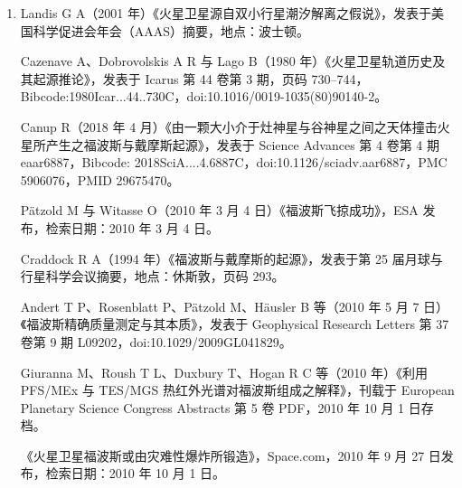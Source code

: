 \begin{enumerate}
\item Landis G A（2001 年）《火星卫星源自双小行星潮汐解离之假说》，发表于美国科学促进会年会（AAAS）摘要，地点：波士顿。

Cazenave A、Dobrovolskis A R 与 Lago B（1980 年）《火星卫星轨道历史及其起源推论》，发表于 Icarus 第 44 卷第 3 期，页码 730–744，Bibcode:1980Icar...44..730C，doi:10.1016/0019-1035(80)90140-2。

Canup R（2018 年 4 月）《由一颗大小介于灶神星与谷神星之间之天体撞击火星所产生之福波斯与戴摩斯起源》，发表于 Science Advances 第 4 卷第 4 期 eaar6887，Bibcode: 2018SciA....4.6887C，doi:10.1126/sciadv.aar6887，PMC 5906076，PMID 29675470。

Pätzold M 与 Witasse O（2010 年 3 月 4 日）《福波斯飞掠成功》，ESA 发布，检索日期：2010 年 3 月 4 日。

Craddock R A（1994 年）《福波斯与戴摩斯的起源》，发表于第 25 届月球与行星科学会议摘要，地点：休斯敦，页码 293。

Andert T P、Rosenblatt P、Pätzold M、Häusler B 等（2010 年 5 月 7 日）《福波斯精确质量测定与其本质》，发表于 Geophysical Research Letters 第 37 卷第 9 期 L09202，doi:10.1029/2009GL041829。

Giuranna M、Roush T L、Duxbury T、Hogan R C 等（2010 年）《利用 PFS/MEx 与 TES/MGS 热红外光谱对福波斯组成之解释》，刊载于 European Planetary Science Congress Abstracts 第 5 卷 PDF，2010 年 10 月 1 日存档。

《火星卫星福波斯或由灾难性爆炸所锻造》，Space.com，2010 年 9 月 27 日发布，检索日期：2010 年 10 月 1 日。

\end{enumerate}

